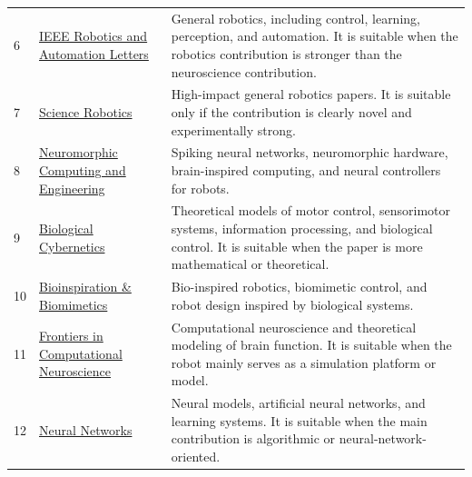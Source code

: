 \documentclass[a4paper]{article}
\begin{document}
\begin{table}[htbp]
\begin{tabularx}{\textwidth}{p{} p{} X}
            6 &
            \href{https://www.ieee-ras.org/publications/ra-l/}{IEEE Robotics and Automation Letters} &
            General robotics, including control, learning, perception, and automation. It is suitable when the robotics contribution is stronger than the neuroscience contribution. \\
            
            7 &
            \href{https://www.science.org/journal/scirobotics}{Science Robotics} &
            High-impact general robotics papers. It is suitable only if the contribution is clearly novel and experimentally strong. \\
            
            8 &
            \href{https://iopscience.iop.org/journal/2634-4386}{Neuromorphic Computing and Engineering} &
            Spiking neural networks, neuromorphic hardware, brain-inspired computing, and neural controllers for robots. \\
            
            9 &
            \href{https://link.springer.com/journal/422}{Biological Cybernetics} &
            Theoretical models of motor control, sensorimotor systems, information processing, and biological control. It is suitable when the paper is more mathematical or theoretical. \\
            
            10 &
            \href{https://iopscience.iop.org/journal/1748-3190}{Bioinspiration \& Biomimetics} &
            Bio-inspired robotics, biomimetic control, and robot design inspired by biological systems. \\
            
            11 &
            \href{https://www.frontiersin.org/journals/computational-neuroscience}{Frontiers in Computational Neuroscience} &
            Computational neuroscience and theoretical modeling of brain function. It is suitable when the robot mainly serves as a simulation platform or model. \\
            
            12 &
            \href{https://www.sciencedirect.com/journal/neural-networks}{Neural Networks} &
            Neural models, artificial neural networks, and learning systems. It is suitable when the main contribution is algorithmic or neural-network-oriented. \\
            
            \hline
        \end{tabularx}
    \end{table}
\end{document}
